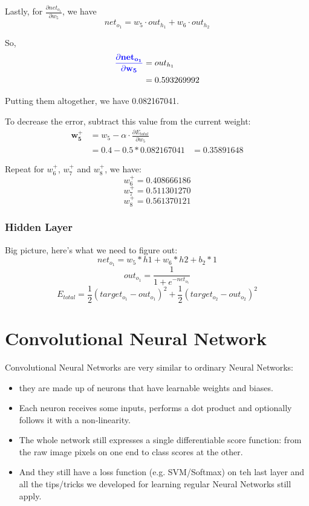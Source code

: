 \documentclass[fleqn,10pt]{olplainarticle}
\theoremstyle{definition}
\theoremstyle{remark}
\begin{document}
Lastly, for $\frac{\partial net_{o_1}}{\partial w_5}$, we have
$$
net_{o_1} = w_5 \cdot out_{h_1} + w_6 \cdot out_{h_2}
$$

So,
$$
\begin{aligned}
\mathbf{\color{blue}{\frac{\partial net_{o_1}}{\partial w_5}}}
& = out_{h_1} \\
& = 0.593269992
\end{aligned}
$$

Putting them altogether, we have 0.082167041.

To decrease the error, subtract this value from the current weight:
$$
\begin{aligned}
\mathbf{w_5^+}
& = w_5 - \alpha \cdot \frac{\partial E_{total}}{\partial w_5} \\
& = 0.4 - 0.5 * 0.082167041
& = 0.35891648
\end{aligned}
$$

Repeat for $w_6^+$, $w_7^+$ and $w_8^+$, we have:
$$w_6^+ = 0.408666186$$
$$w_7^+ = 0.511301270$$
$$w_8^+ = 0.561370121$$

\subsubsection*{Hidden Layer}
Big picture, here's what we need to figure out:
$$
net_{o_1} = w_5 * h1 + w_6 * h2 + b_2 * 1
$$
$$
out_{o_1} = \frac{1}{1 + e^{-net_{o_1}}}
$$
$$E_{total} = \frac{1}{2}(target_{o_1} - out_{o_1})^2 + \frac{1}{2}(target_{o_2} - out_{o_2})^2$$

\section*{Convolutional Neural Network}
Convolutional Neural Networks are very similar to ordinary Neural Networks: 
\begin{itemize}
\item they are made up of neurons that have learnable weights and biases.
\item Each neuron receives some inputs, performs a dot product and optionally follows it with a non-linearity.
\item The whole network still expresses a single differentiable score function: from the raw image pixels on one end to class scores at the other.
\item And they still have a loss function (e.g. SVM/Softmax) on teh last layer and all the tips/tricks we developed for learning regular Neural Networks still apply.
\end{itemize}
\end{document}
